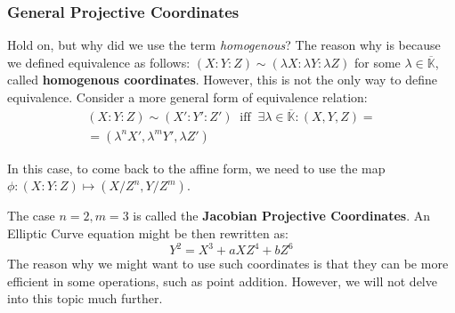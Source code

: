\documentclass[../lecture-notes.tex]{subfiles}
\begin{document}
\subsubsection{General Projective Coordinates}
Hold on, but why did we use the term \textit{homogenous}? The reason why is because we defined equivalence as follows: $(X:Y:Z) \sim (\lambda X: \lambda Y: \lambda Z)$ for some $\lambda \in \overline{\mathbb{K}}$, called \textbf{homogenous coordinates}. However, this is not the only way to define equivalence. Consider a more general form of equivalence relation:
\begin{equation*}
    \begin{aligned}
        (X:Y:Z) \sim (X':Y':Z') \;\; \text{iff} \;\; \exists \lambda \in \overline{\mathbb{K}}: (X,Y,Z) = \\
        = (\lambda^n X', \lambda^m Y', \lambda Z')
    \end{aligned}
\end{equation*}

In this case, to come back to the affine form, we need to use the map $\phi: (X:Y:Z) \mapsto (X/Z^n, Y/Z^m)$. 
\begin{example}
    The case $n=2,m=3$ is called the \textbf{Jacobian Projective Coordinates}. An Elliptic Curve equation might be then rewritten as: 
    \begin{equation*}
        Y^2 = X^3 + aXZ^4 + bZ^6
    \end{equation*}
    The reason why we might want to use such coordinates is that they can be more efficient in some operations, such as point addition. However, we will not delve into this topic much further.
\end{example}
\end{document}
